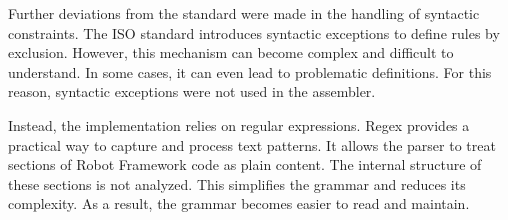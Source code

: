 Further deviations from the standard were made in the handling of syntactic constraints. The ISO standard introduces syntactic exceptions to define rules by exclusion. However, this mechanism can become complex and difficult to understand. In some cases, it can even lead to problematic definitions. For this reason, syntactic exceptions were not used in the assembler.

Instead, the implementation relies on regular expressions. Regex provides a practical way to capture and process text patterns. It allows the parser to treat sections of Robot Framework code as plain content. The internal structure of these sections is not analyzed. This simplifies the grammar and reduces its complexity. As a result, the grammar becomes easier to read and maintain.